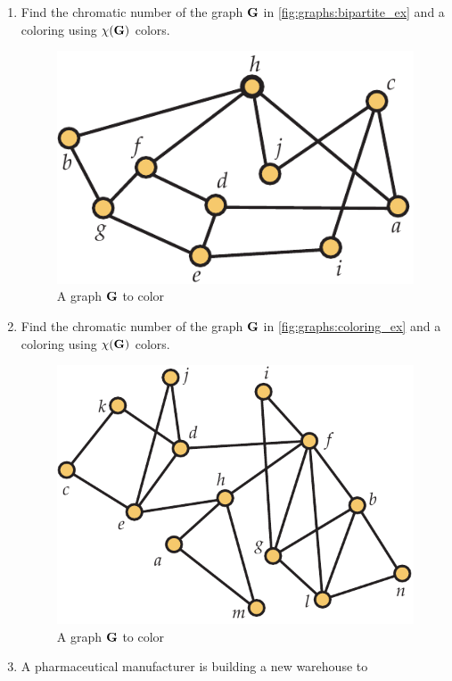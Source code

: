 \begin{enumerate}
\item Find the chromatic number of the graph $\mathbf{G}$ in
  \autoref{fig:graphs:bipartite_ex} and a coloring using $\chi(\mathbf{G})$ colors.
  \begin{figure}[h]
    \centering
    \includegraphics[scale=0.6]{graphs-figs/bipartite_ex}
    \caption{A graph $\mathbf{G}$ to color}
    \label{fig:graphs:bipartite_ex}
  \end{figure}
\item Find the chromatic number of the graph $\mathbf{G}$ in
  \autoref{fig:graphs:coloring_ex} and a coloring using $\chi(\mathbf{G})$ colors.
  \begin{figure}[h]
    \centering
    \includegraphics[scale=0.6]{graphs-figs/coloring_ex}
    \caption{A graph $\mathbf{G}$ to color}
    \label{fig:graphs:coloring_ex}
  \end{figure}
\item A pharmaceutical manufacturer is building a new warehouse to

\end{enumerate}
